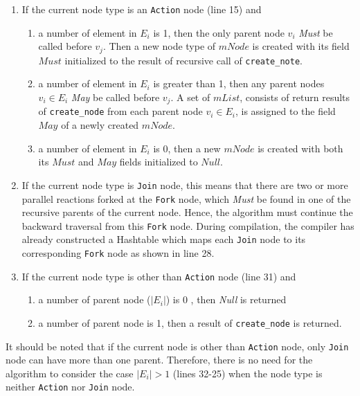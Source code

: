 \begin{enumerate}

	\item If the current node type is an \texttt{Action} node (line 15)
		and

		\begin{enumerate}

			\item a number of element in $E_i$ is 1, then the only parent node
				$v_i$ \textit{Must} be called before $v_j$. Then a new node type
				of $mNode$ is created with its field $Must$ initialized to the
				result of recursive call of \texttt{create\_note}.

			\item a number of element in $E_i$ is greater than 1, then any
				parent nodes $v_i \in E_i$ \textit{May} be called before $v_j$.
				A set of $mList$, consists of return results of
				\texttt{create\_node} from each parent node $v_i \in E_i$, is
				assigned to the field $May$ of a newly created $mNode$. 

			\item a number of element in $E_i$ is 0, then a new $mNode$ is
				created with both its $Must$ and $May$ fields initialized to
				$Null$.

		\end{enumerate}

	\item If the current node type is \texttt{Join} node, this means that
		there are two or more parallel reactions forked at the \texttt{Fork}
		node, which \textit{Must} be found in one of the recursive parents
		of the current node. Hence, the algorithm must continue the backward
		traversal from this \texttt{Fork} node. During compilation, the
		compiler has already constructed a Hashtable which maps each
		\texttt{Join} node to its corresponding \texttt{Fork} node as shown
		in line 28. 

	\item If the current node type is other than \texttt{Action} node (line
		31) and

		\begin{enumerate}

			\item a number of parent node ($|E_i|$) is 0 , then \textit{Null}
				is returned

			\item a number of parent node is 1, then a result of
				\texttt{create\_node} is returned.

		\end{enumerate}

\end{enumerate}

It should be noted that if the current node is other than
\texttt{Action} node, only \texttt{Join} node can have more than one
parent. Therefore, there is no need for the algorithm to consider the
case $|E_i| > 1$ (lines 32-25) when the node type is neither
\texttt{Action} nor \texttt{Join} node.



